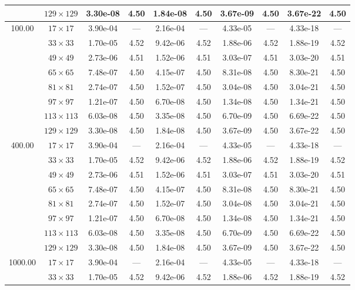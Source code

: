 \documentclass[preprint, 12pt]{elsarticle}
\begin{document}
\begin{center}
\begin{table}[H]
{\begin{tabular*}{\textwidth}{@{\extracolsep\fill}cccccccccc@{}}
    & $129\times 129$ & 3.30e-08 & 4.50 & 1.84e-08 & 4.50 & 3.67e-09 & 4.50 & 3.67e-22 & 4.50 \\
    \hline
    \multirow{7}{*}{100.00} & $17\times 17$ & 3.90e-04 & --- & 2.16e-04 & --- & 4.33e-05 & --- & 4.33e-18 & --- \\
    & $33\times 33$ & 1.70e-05 & 4.52 & 9.42e-06 & 4.52 & 1.88e-06 & 4.52 & 1.88e-19 & 4.52 \\
    & $49\times 49$ & 2.73e-06 & 4.51 & 1.52e-06 & 4.51 & 3.03e-07 & 4.51 & 3.03e-20 & 4.51 \\
    & $65\times 65$ & 7.48e-07 & 4.50 & 4.15e-07 & 4.50 & 8.31e-08 & 4.50 & 8.30e-21 & 4.50 \\
    & $81\times 81$ & 2.74e-07 & 4.50 & 1.52e-07 & 4.50 & 3.04e-08 & 4.50 & 3.04e-21 & 4.50 \\
    & $97\times 97$ & 1.21e-07 & 4.50 & 6.70e-08 & 4.50 & 1.34e-08 & 4.50 & 1.34e-21 & 4.50 \\
    & $113\times 113$ & 6.03e-08 & 4.50 & 3.35e-08 & 4.50 & 6.70e-09 & 4.50 & 6.69e-22 & 4.50 \\
    & $129\times 129$ & 3.30e-08 & 4.50 & 1.84e-08 & 4.50 & 3.67e-09 & 4.50 & 3.67e-22 & 4.50 \\
    \hline
    \multirow{7}{*}{400.00} & $17\times 17$ & 3.90e-04 & --- & 2.16e-04 & --- & 4.33e-05 & --- & 4.33e-18 & --- \\
    & $33\times 33$ & 1.70e-05 & 4.52 & 9.42e-06 & 4.52 & 1.88e-06 & 4.52 & 1.88e-19 & 4.52 \\
    & $49\times 49$ & 2.73e-06 & 4.51 & 1.52e-06 & 4.51 & 3.03e-07 & 4.51 & 3.03e-20 & 4.51 \\
    & $65\times 65$ & 7.48e-07 & 4.50 & 4.15e-07 & 4.50 & 8.31e-08 & 4.50 & 8.30e-21 & 4.50 \\
    & $81\times 81$ & 2.74e-07 & 4.50 & 1.52e-07 & 4.50 & 3.04e-08 & 4.50 & 3.04e-21 & 4.50 \\
    & $97\times 97$ & 1.21e-07 & 4.50 & 6.70e-08 & 4.50 & 1.34e-08 & 4.50 & 1.34e-21 & 4.50 \\
    & $113\times 113$ & 6.03e-08 & 4.50 & 3.35e-08 & 4.50 & 6.70e-09 & 4.50 & 6.69e-22 & 4.50 \\
    & $129\times 129$ & 3.30e-08 & 4.50 & 1.84e-08 & 4.50 & 3.67e-09 & 4.50 & 3.67e-22 & 4.50 \\
    \hline
    \multirow{7}{*}{1000.00} & $17\times 17$ & 3.90e-04 & --- & 2.16e-04 & --- & 4.33e-05 & --- & 4.33e-18 & --- \\
    & $33\times 33$ & 1.70e-05 & 4.52 & 9.42e-06 & 4.52 & 1.88e-06 & 4.52 & 1.88e-19 & 4.52 \\

\end{tabular*}}
\end{table}
\end{center}
\end{document}
